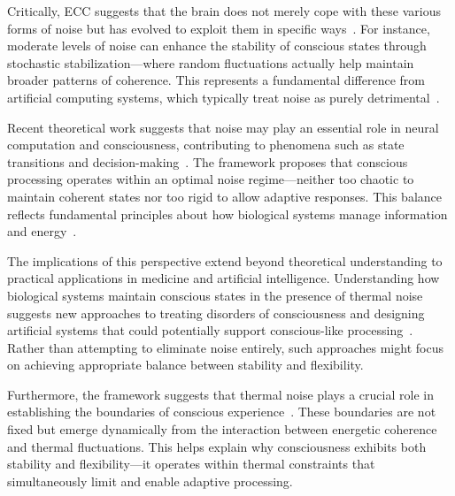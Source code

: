 Critically, ECC suggests that the brain does not merely cope with these various forms of noise but has evolved to exploit them in specific ways~\cite{freeman2007}. For instance, moderate levels of noise can enhance the stability of conscious states through stochastic stabilization—where random fluctuations actually help maintain broader patterns of coherence. This represents a fundamental difference from artificial computing systems, which typically treat noise as purely detrimental~\cite{landauer1996}.

Recent theoretical work suggests that noise may play an essential role in neural computation and consciousness, contributing to phenomena such as state transitions and decision-making~\cite{van2025processes}. The framework proposes that conscious processing operates within an optimal noise regime—neither too chaotic to maintain coherent states nor too rigid to allow adaptive responses. This balance reflects fundamental principles about how biological systems manage information and energy~\cite{zheng2025unbearable}.

The implications of this perspective extend beyond theoretical understanding to practical applications in medicine and artificial intelligence. Understanding how biological systems maintain conscious states in the presence of thermal noise suggests new approaches to treating disorders of consciousness and designing artificial systems that could potentially support conscious-like processing~\cite{hunt2024electromagnetic}. Rather than attempting to eliminate noise entirely, such approaches might focus on achieving appropriate balance between stability and flexibility.

Furthermore, the framework suggests that thermal noise plays a crucial role in establishing the boundaries of conscious experience~\cite{bosl2025dynamical}. These boundaries are not fixed but emerge dynamically from the interaction between energetic coherence and thermal fluctuations. This helps explain why consciousness exhibits both stability and flexibility—it operates within thermal constraints that simultaneously limit and enable adaptive processing.

